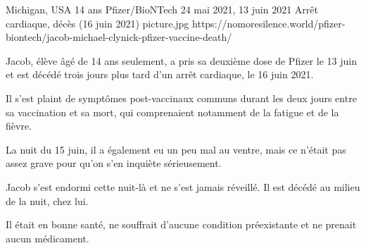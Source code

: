 {Michigan, USA}
{14 ans}
{Pfizer/BioNTech}
{24 mai 2021, 13 juin 2021}
{Arrêt cardiaque, décès (16 juin 2021)}
{picture.jpg}
{https://nomoresilence.world/pfizer-biontech/jacob-michael-clynick-pfizer-vaccine-death/}
{

Jacob, élève âgé de 14 ans seulement, a pris sa deuxième dose de Pfizer le 13
juin et est décédé trois jours plus tard d'un arrêt cardiaque, le 16 juin 2021.

Il s'est plaint de symptômes post-vaccinaux communs durant les deux jours entre
sa vaccination et sa mort, qui comprenaient notamment de la fatigue et de la
fièvre.

La nuit du 15 juin, il a également eu un peu mal au ventre, mais ce n'était pas
assez grave pour qu'on s'en inquiète sérieusement.

Jacob s'est endormi cette nuit-là et ne s'est jamais réveillé. Il est décédé au
milieu de la nuit, chez lui.

Il était en bonne santé, ne souffrait d'aucune condition préexistante et ne
prenait aucun médicament.

}
